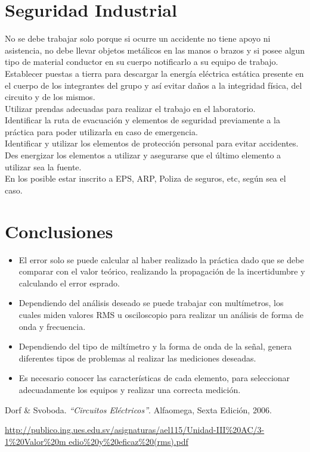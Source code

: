 \documentclass[twocolumn]{IEEEtran}
\begin{document}
\section{Seguridad Industrial}
\noindent
No se debe trabajar solo porque si ocurre un accidente no tiene apoyo ni
asistencia, no debe llevar objetos metálicos en las manos o brazos y si posee
algun tipo de material conductor en su cuerpo notificarlo a su equipo de
trabajo.\\
Establecer puestas a tierra para descargar la energía eléctrica estática
presente en el cuerpo de los integrantes del grupo y así evitar daños a la
integridad física, del circuito y de los mismos.\\
Utilizar prendas adecuadas para realizar el trabajo en el laboratorio.\\
Identificar la ruta de evacuación y elementos de seguridad previamente a la
práctica para poder utilizarla en caso de emergencia.\\
Identificar y utilizar los elementos de protección personal para evitar
accidentes.\\
Des energizar los elementos a utilizar y asegurarse que el último elemento a
utilizar sea la fuente.\\
En los posible estar inscrito a EPS, ARP, Poliza de seguros, etc, según sea el
caso.

\section{Conclusiones}
\begin{itemize}
  \item El error solo se puede calcular al haber realizado la práctica dado que
se debe comparar con el valor teórico, realizando la propagación de la
incertidumbre y calculando el error esprado.
  \item Dependiendo del análisis deseado se puede trabajar con multímetros, los
cuales miden valores RMS u osciloscopio para realizar un análisis de forma de
onda y frecuencia.
  \item Dependiendo del tipo de miltímetro y la forma de onda de la señal,
genera diferentes tipos de problemas al realizar las mediciones deseadas.
  \item Es necesario conocer las características de cada elemento, para
seleccionar adecuadamente los equipos y realizar una correcta medición.
\end{itemize}


\begin{thebibliography}{99}
 Dorf  \& Svoboda.
{\em "`Circuitos Eléctricos"'}.
Alfaomega, Sexta Edición, 2006.

\url{http://publico.ing.ues.edu.sv/asignaturas/ael115/Unidad-III%
edio%
\end{thebibliography}
\end{document}
